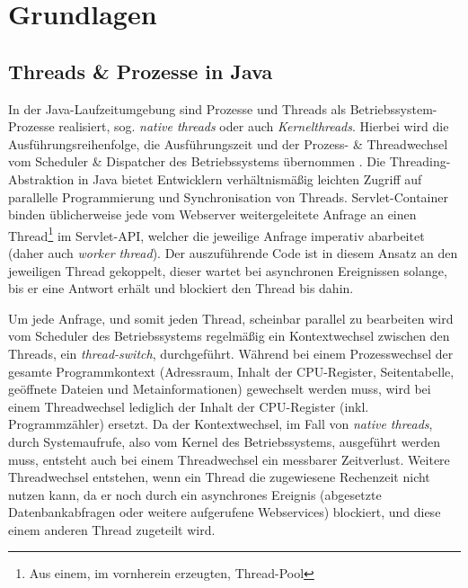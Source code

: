 
\section{Grundlagen}
\label{section:grundlagen}

\subsection{Threads \& Prozesse in Java}
\label{sections:treads_prozesse}
In der Java-Laufzeitumgebung sind Prozesse und Threads als Betriebssystem-Prozesse realisiert, sog. \textit{native threads} oder auch \textit{Kernelthreads}.
Hierbei wird die Ausführungsreihenfolge, die Ausführungszeit und der Prozess- \& Threadwechsel
vom Scheduler \& Dispatcher des Betriebssystems übernommen \parencite{Tanenbaum2016}.
Die Threading-Abstraktion in Java bietet Entwicklern verhältnismäßig leichten Zugriff auf parallelle Programmierung und Synchronisation von Threads.\newline
Servlet-Container binden üblicherweise jede vom Webserver weitergeleitete Anfrage an einen
Thread\footnote{Aus einem, im vornherein erzeugten, Thread-Pool} im Servlet-API, welcher die jeweilige Anfrage imperativ abarbeitet
(daher auch \textit{worker thread}).\newline
Der auszuführende Code ist in diesem Ansatz an den jeweiligen Thread gekoppelt, dieser wartet bei
asynchronen Ereignissen solange, bis er eine Antwort erhält und blockiert den Thread bis dahin.

Um jede Anfrage, und somit jeden Thread, scheinbar parallel zu bearbeiten wird vom Scheduler
des Betriebssystems regelmäßig ein Kontextwechsel zwischen den Threads,
ein \textit{thread-switch}, durchgeführt. Während bei einem Prozesswechsel der gesamte Programmkontext (Adressraum, Inhalt der CPU-Register,
Seitentabelle, geöffnete Dateien und Metainformationen)
gewechselt werden muss, wird bei einem Threadwechsel lediglich der Inhalt der CPU-Register (inkl. Programmzähler) ersetzt\parencite{Brosenne2021}\parencite{Mosberger2002}.
Da der Kontextwechsel, im Fall von \textit{native threads}, durch Systemaufrufe, also vom Kernel des Betriebssystems, ausgeführt werden muss, entsteht auch
bei einem Threadwechsel ein messbarer Zeitverlust.\newline
Weitere Threadwechsel entstehen, wenn ein Thread die zugewiesene Rechenzeit nicht nutzen kann, da er noch durch ein asynchrones Ereignis
(abgesetzte Datenbankabfragen oder weitere aufgerufene Webservices) blockiert, und diese einem anderen Thread zugeteilt wird.

